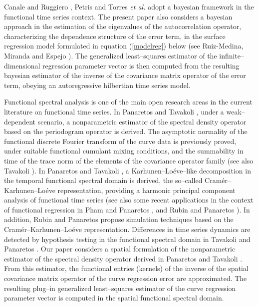 \documentclass[11pt,a4paper]{article}
\begin{document}
  Canale  and Ruggiero \cite{CanaleRuggiero16},  Petris  \cite{Petris18}  and Torres \emph{et al.} \cite{TorresSignes21} adopt a  bayesian framework   in the functional time series context.
The present  paper also considers  a bayesian approach in the estimation of the eigenvalues of the autocorrelation operator, characterizing the dependence structure of the error term, in the   surface regression model formulated in equation (\ref{modelreg}) below (see Ruiz-Medina,  Miranda and  Espejo \cite{RuizMedinaMirandaEspejo19}). The generalized least--squares  estimator of the infinite--dimensional regression   parameter vector is then   computed from the resulting   bayesian estimator of the inverse of the  covariance matrix operator of the error term, obeying an autoregressive hilbertian time series model.

 Functional spectral analysis  is one of the main open research areas in the current literature on functional time series. In Panaretos and Tavakoli  \cite{PanaretosTavakoli13a},
  under a weak--dependent scenario, a nonparametric estimator of the spectral density operator based on the periodogram operator is derived. The asymptotic normality of the functional discrete Fourier transform of the curve data is previously proved, under suitable functional cumulant mixing conditions,  and the summability in time of the trace norm of the elements of the  covariance operator family (see also Tavakoli  \cite{Tavakoli14}).  In Panaretos and Tavakoli \cite{PanaretosTavakoli13b}, a Karhunen--Lo\'eve--like decomposition in the temporal functional spectral domain is derived, the so--called   Cram\'er--Karhunen--Lo\'eve representation, providing a harmonic principal component analysis of functional time series (see also some recent applications in the context of functional regression in  Pham  and  Panaretos \cite{PhanPanaretos18}, and   Rubin and Panaretos \cite{RubinPanaretos20a}). In addition,  Rubin and Panaretos \cite{RubinPanaretos20b}    propose simulation techniques based on the  Cram\'er--Karhunen--Lo\'eve representation. Differences in time series dynamics are detected  by hypothesis testing in the functional spectral domain in  Tavakoli and Panaretos \cite{TavakoliPanaretos16}.
Our paper considers
 a spatial  formulation of the nonparametric estimator of the spectral density operator derived  in
Panaretos and Tavakoli  \cite{PanaretosTavakoli13a}. From this estimator,  the functional entries (kernels) of the inverse of the spatial covariance matrix operator of the  curve regression error are approximated. The resulting  plug--in  generalized  least--squares estimator of the curve regression  parameter vector is computed in the spatial functional spectral domain.
\end{document}
